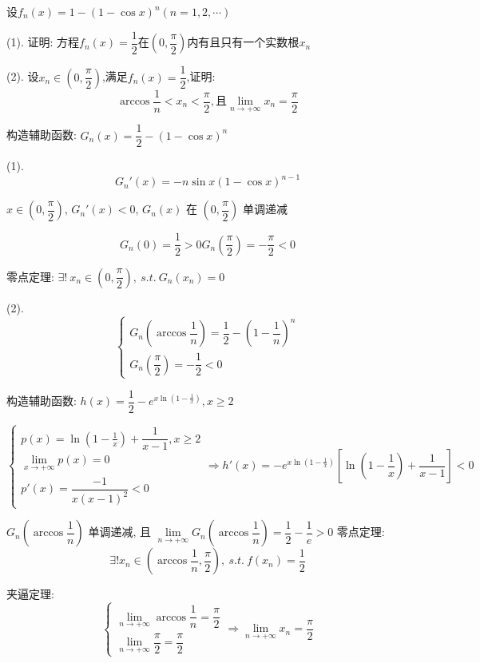 \begin{proposition}
	设$f_{n}(x)=1-(1-\cos x)^n(n=1,2,\cdots)$

(1). 证明:  方程$f_{n}(x)=\dfrac{1}{2}$在$(0,\dfrac{\pi}{2})$内有且只有一个实数根$x_{n}$

(2). 设$x_{n}\in(0,\dfrac{\pi}{2})$,满足$f_{n}(x)=\dfrac{1}{2}$,证明:  $$\arccos \dfrac{1}{n}<x_{n}<\dfrac{\pi}{2},\text{且}\lim\limits_{n\rightarrow +\infty}x_{n}=\dfrac{\pi}{2}$$
\end{proposition}
\begin{solution}
	
	构造辅助函数: $G_{n}(x)=\dfrac{1}{2}-(1-\cos x)^{n}$
	
	(1). $$G_{n}'(x)=-n\sin x(1-\cos x)^{n-1}$$
	
	$x\in(0,\dfrac{\pi}{2})$, $G_{n}'(x)<0$, $G_{n}(x)$ 在 $(0,\dfrac{\pi}{2})$ 单调递减
	
	$$G_{n}(0)=\dfrac{1}{2}>0  G_{n}(\dfrac{\pi}{2})=-\dfrac{\pi}{2}<0$$
	
	零点定理: $\exists!\ x_{n}\in(0,\dfrac{\pi}{2}),\ s.t.\ G_{n}(x_{n})=0$
	
	(2). 
	$$\begin{cases}
		G_{n}(\arccos\dfrac{1}{n}) = \dfrac{1}{2}-(1-\dfrac{1}{n})^{n} \\
		G_{n}(\dfrac{\pi}{2}) = -\dfrac{1}{2} < 0
	\end{cases}$$
	
    构造辅助函数: $h(x) = \dfrac{1}{2} - e^{x\ln(1-\frac{1}{x})},x\geq 2$
	
	$$\begin{cases}
		p(x) = \ln(1-\frac{1}{x}) + \dfrac{1}{x-1}, x\geq 2\\
		\lim\limits_{x\to +\infty} p(x) = 0\\
		p'(x) = \dfrac{-1}{x(x-1)^{2}} < 0  
	\end{cases}\Rightarrow 
	h'(x) = -e^{x\ln(1-\frac{1}{x})}\left[\ln(1-\frac{1}{x})+\dfrac{1}{x-1}\right] < 0$$
	
	$G_{n}(\arccos\dfrac{1}{n})$ 单调递减, 且 $\lim\limits_{n\rightarrow+\infty}G_{n}(\arccos\dfrac{1}{n})=\dfrac{1}{2}-\dfrac{1}{e}>0$
	零点定理: 
	$$\exists! x_{n}\in (\arccos \dfrac{1}{n}, \dfrac{\pi}{2}),\ s.t.\ f(x_{n}) = \dfrac{1}{2}$$
	
	夹逼定理:  
	$$\begin{cases}
		\lim\limits_{n\rightarrow  +\infty}\arccos \dfrac{1}{n}=\dfrac{\pi}{2}\\
		\lim\limits_{n\rightarrow  +\infty}\dfrac{\pi}{2}=\dfrac{\pi}{2}
	\end{cases}
	\Rightarrow \lim\limits_{n\rightarrow +\infty}x_{n}=\dfrac{\pi}{2}$$
	
\end{solution}

